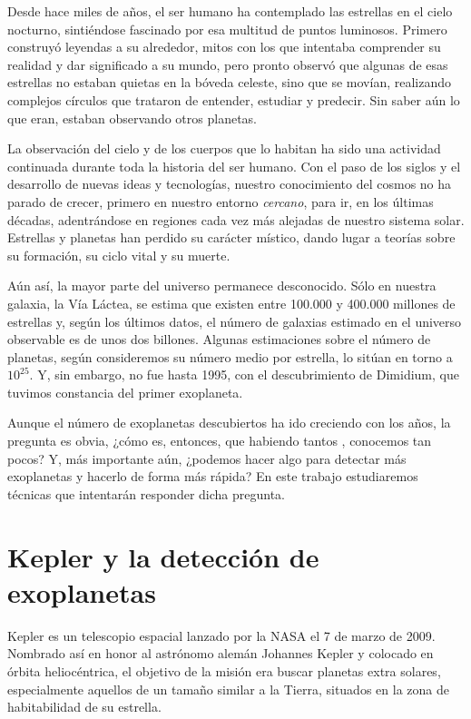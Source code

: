 
Desde hace miles de años, el ser humano ha contemplado las estrellas en el cielo nocturno, sintiéndose fascinado por esa multitud de puntos luminosos. Primero construyó leyendas a su alrededor, mitos con los que intentaba comprender su realidad y dar significado a su mundo, pero pronto observó que algunas de esas estrellas no estaban quietas en la bóveda celeste, sino que se movían, realizando complejos círculos que trataron de entender, estudiar y predecir. Sin saber aún lo que eran, estaban observando otros planetas. 

La observación del cielo y de los cuerpos que lo habitan ha sido una actividad continuada durante toda la historia del ser humano. Con el paso de los siglos y el desarrollo de nuevas ideas y tecnologías, nuestro conocimiento del cosmos no ha parado de crecer, primero en nuestro entorno \textit{cercano}, para ir, en los últimas décadas, adentrándose en regiones cada vez más alejadas de nuestro sistema solar. Estrellas y planetas han perdido su carácter místico, dando lugar a teorías sobre su formación, su ciclo vital y su muerte.

Aún así, la mayor parte del universo permanece desconocido. Sólo en nuestra galaxia, la Vía Láctea, se estima que existen entre 100.000 y 400.000 millones de estrellas y, según los últimos datos, el número de galaxias estimado en el universo observable es de unos dos billones. Algunas estimaciones sobre el número de planetas, según consideremos su número medio por estrella, lo sitúan en torno a $10^{25}$. Y, sin embargo, no fue hasta 1995, con el descubrimiento de Dimidium, que tuvimos constancia del primer exoplaneta.

Aunque el número de exoplanetas descubiertos ha ido creciendo con los años, la pregunta es obvia, ¿cómo es, entonces, que habiendo tantos , conocemos tan pocos? Y, más importante aún, ¿podemos hacer algo para detectar más exoplanetas y hacerlo de forma más rápida? En este trabajo estudiaremos técnicas que intentarán responder dicha pregunta.    

\section{Kepler y la detección de exoplanetas}

Kepler es un telescopio espacial lanzado por la NASA el 7 de marzo de 2009. Nombrado así en honor al astrónomo alemán Johannes Kepler y colocado en órbita heliocéntrica, el objetivo de la misión era buscar planetas extra solares, especialmente aquellos de un tamaño similar a la Tierra, situados en la zona de habitabilidad de su estrella.

